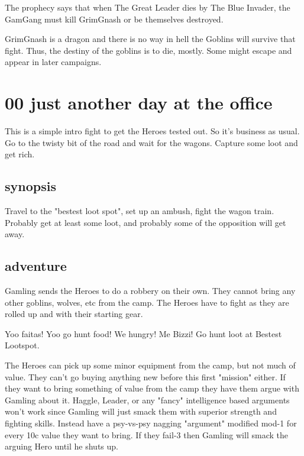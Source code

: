 The prophecy says that when The Great Leader dies by The Blue Invader, the GamGang must kill GrimGnash or be themselves destroyed.

GrimGnash is a dragon and there is no way in hell the Goblins will survive that fight. Thus, the destiny of the goblins is to die, mostly. Some might escape and appear in later campaigns.









\newpage
\section*{00 just another day at the office}

This is a simple intro fight to get the Heroes tested out. So it's business as usual. Go to the twisty bit of the road and wait for the wagons. Capture some loot and get rich.


\subsection*{synopsis}

Travel to the "bestest loot spot", set up an ambush, fight the wagon train. Probably get at least some loot, and probably some of the opposition will get away.


\subsection*{adventure}

Gamling sends the Heroes to do a robbery on their own. They cannot bring any other goblins, wolves, etc from the camp. The Heroes have to fight as they are rolled up and with their starting gear.

\begin{readoutloud}
Yoo faitas! Yoo go hunt food! We hungry! Me Bizzi! Go hunt loot at Bestest Lootspot.
\end{readoutloud}

The Heroes can pick up some minor equipment from the camp, but not much of value. They can't go buying anything new before this first "mission" either. If they want to bring something of value from the camp they have them argue with Gamling about it. Haggle, Leader, or any "fancy" intelligence based arguments won't work since Gamling will just smack them with superior strength and fighting skills. Instead have a psy-vs-psy nagging "argument" modified mod-1 for every 10c value they want to bring. If they fail-3 then Gamling will smack the arguing Hero until he shuts up.

